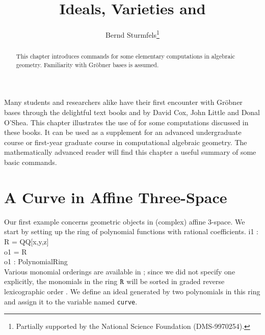 \title{Ideals, Varieties and \Mtwo}
\author{Bernd Sturmfels\thanks{Partially supported by
the National Science Foundation (DMS-9970254).}}
\maketitle

\begin{abstract}
This chapter introduces \Mtwo commands for
some elementary computations in algebraic geometry.
Familiarity with Gr\"obner bases is assumed.
\end{abstract}

Many students and researchers alike have their first encounter with
Gr\"ob\-ner bases through the delightful text books \cite{CLO1} and \cite{CLO2}
by David Cox, John Little and Donal O'Shea. This chapter illustrates
the use of \Mtwo for some computations discussed in these books.
It can be used as a supplement for an advanced undergraduate course or 
first-year graduate course in computational algebraic geometry. The
mathematically advanced reader will find this chapter a useful summary
of some basic \Mtwo commands.

\section{A Curve in Affine Three-Space}

Our first example concerns geometric objects in
(complex) affine 3-space. We start by
setting up the ring of polynomial functions with rational coefficients.
\beginOutput
i1 : R = QQ[x,y,z]\\
\emptyLine
o1 = R\\
\emptyLine
o1 : PolynomialRing\\
\endOutput
Various monomial orderings are available in \Mtwo; since we did not specify
one explicitly, the monomials in the ring ${\tt R}$ will be sorted in 
graded reverse lexicographic order  \cite[\S I.2, Definition 6]{CLO1}.
We define an ideal generated by two polynomials
in this ring and assign it to the variable named 
{\tt curve}.

